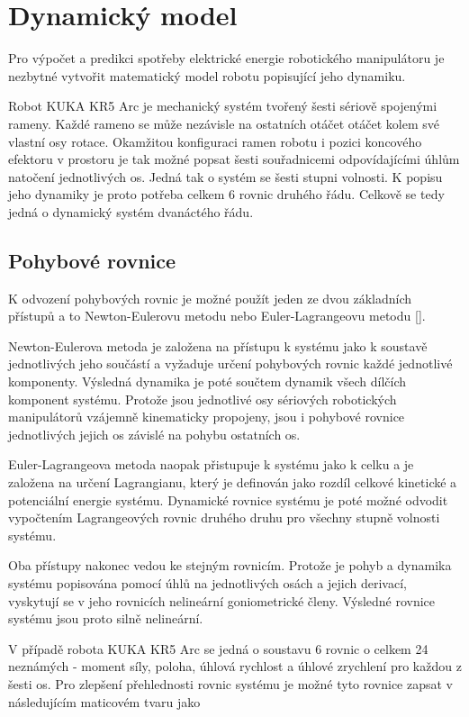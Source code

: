 

\chapter{Dynamický model}

Pro výpočet a predikci spotřeby elektrické energie robotického manipulátoru je nezbytné vytvořit matematický model robotu popisující jeho dynamiku.

Robot KUKA KR5 Arc je mechanický systém tvořený šesti sériově spojenými rameny. Každé rameno se může nezávisle na ostatních otáčet otáčet kolem své vlastní osy rotace. Okamžitou konfiguraci ramen robotu i pozici koncového efektoru v prostoru je tak možné popsat šesti souřadnicemi odpovídajícími úhlům natočení jednotlivých os. Jedná tak o systém se šesti stupni volnosti. K popisu jeho dynamiky je proto potřeba celkem 6 rovnic druhého řádu. Celkově se tedy jedná o dynamický systém dvanáctého řádu. 

\section{Pohybové rovnice}
\label{pohybove_rovnice_sec}
K odvození pohybových rovnic je možné použít jeden ze dvou základních přístupů a to Newton-Eulerovu metodu nebo Euler-Lagrangeovu metodu [\cite{rob_mod_control}]. 

Newton-Eulerova metoda je založena na přístupu k systému jako k soustavě jednotlivých jeho součástí a vyžaduje určení pohybových rovnic každé jednotlivé komponenty. Výsledná dynamika je poté součtem dynamik všech dílčích komponent systému. Protože jsou jednotlivé osy sériových robotických manipulátorů vzájemně kinematicky propojeny, jsou i pohybové rovnice jednotlivých jejich os závislé na pohybu ostatních os. 

Euler-Lagrangeova metoda naopak přistupuje k systému jako k celku a je založena na určení Lagrangianu, který je definován jako rozdíl celkové kinetické a potenciální energie systému. Dynamické rovnice systému je poté možné odvodit vypočtením Lagrangeových rovnic druhého druhu pro všechny stupně volnosti systému.

Oba přístupy nakonec vedou ke stejným rovnicím. Protože je pohyb a dynamika systému popisována pomocí úhlů na jednotlivých osách a jejich derivací, vyskytují se v jeho rovnicích nelineární goniometrické členy. Výsledné rovnice systému jsou proto silně nelineární. 

V případě robota KUKA KR5 Arc se jedná o soustavu 6 rovnic o celkem 24 neznámých  - moment síly, poloha, úhlová rychlost a úhlové zrychlení pro každou z šesti os. Pro zlepšení přehlednosti rovnic systému je možné tyto rovnice zapsat v následujícím maticovém tvaru jako 

